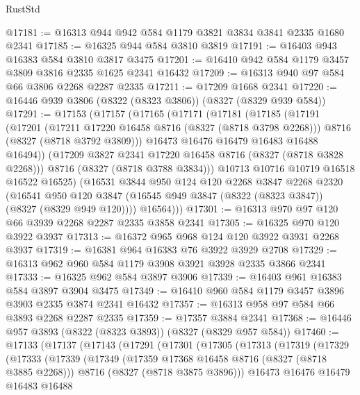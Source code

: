 \begin{lexlean}{RustStd}
\begin{coremodule}
{\begin{coremodule}
{{{{{{{{{{{{{{{{{{{{{{{{{{{{{{{{{{{{{{{{{{{{{{{{{{{{{{@17181 := @16313 @944 @942 @584 @1179 @3821 @3834 @3841 @2335 @1680 @2341
@17185 := @16325 @944 @584 @3810 @3819
@17191 := @16403 @943 @16383 @584 @3810 @3817 @3475
@17201 := @16410 @942 @584 @1179 @3457 @3809 @3816 @2335 @1625 @2341 @16432
@17209 := @16313 @940 @97 @584 @66 @3806 @2268 @2287 @2335
@17211 := @17209 @1668 @2341
@17220 := @16446 @939 @3806 (@8322 (@8323 @3806)) (@8327 (@8329 @939 @584))
@17291 := @17153
    (@17157
      (@17165
        (@17171
          (@17181
            (@17185
              (@17191
                (@17201
                  (@17211 @17220 @16458 @8716 (@8327 (@8718 @3798 @2268)))
                  @8716
                  (@8327 (@8718 @3792 @3809)))
                @16473
                @16476
                @16479
                @16483
                @16488
                @16494))
            (@17209 @3827 @2341 @17220 @16458 @8716 (@8327 (@8718 @3828 @2268)))
            @8716
            (@8327 (@8718 @3788 @3834)))
          @10713
          @10716
          @10719
          @16518
          @16522
          @16525)
        (@16531
          @3844
          @950
          @124
          @120
          @2268
          @3847
          @2268
          @2320
          (@16541
            @950
            @120
            @3847
            (@16545 @949 @3847 (@8322 (@8323 @3847)) (@8327 (@8329 @949 @120))))
          @16564)))
@17301 := @16313 @970 @97 @120 @66 @3939 @2268 @2287 @2335 @3858 @2341
@17305 := @16325 @970 @120 @3922 @3937
@17313 := @16372 @965 @968 @124 @120 @3922 @3931 @2268 @3937
@17319 := @16381 @964 @16383 @76 @3922 @3929 @2708
@17329 := @16313 @962 @960 @584 @1179 @3908 @3921 @3928 @2335 @3866 @2341
@17333 := @16325 @962 @584 @3897 @3906
@17339 := @16403 @961 @16383 @584 @3897 @3904 @3475
@17349 := @16410 @960 @584 @1179 @3457 @3896 @3903 @2335 @3874 @2341 @16432
@17357 := @16313 @958 @97 @584 @66 @3893 @2268 @2287 @2335
@17359 := @17357 @3884 @2341
@17368 := @16446 @957 @3893 (@8322 (@8323 @3893)) (@8327 (@8329 @957 @584))
@17460 := @17133
    (@17137
      (@17143
        (@17291
          (@17301
            (@17305
              (@17313
                (@17319
                  (@17329
                    (@17333
                      (@17339
                        (@17349
                          (@17359 @17368 @16458 @8716 (@8327 (@8718 @3885 @2268)))
                          @8716
                          (@8327 (@8718 @3875 @3896)))
                        @16473
                        @16476
                        @16479
                        @16483
                        @16488
}}}}}}}}}}}}}}}}}}}}}}}}}}}}}}}}}}}}}}}}}}}}}}}}}}}}}}
\end{coremodule}}
\end{coremodule}
\end{lexlean}
